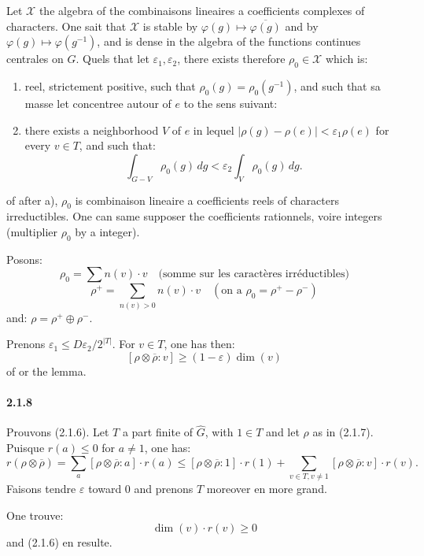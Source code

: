 \documentclass[12pt,a4paper]{article}
\theoremstyle{plain}
\theoremstyle{definition}
\theoremstyle{remark}
\begin{document}
Let $\mathcal{X}$ the algebra of the combinaisons lineaires a coefficients complexes of characters. One sait that $\mathcal{X}$ is stable by $\varphi(g) \mapsto \overline{\varphi(g)}$ and by $\varphi(g) \mapsto \varphi(g^{-1})$, and is dense in the algebra of the functions continues centrales on $G$. Quels that let $\varepsilon_1, \varepsilon_2$, there exists therefore $\rho_0 \in \mathcal{X}$ which is:
\begin{enumerate}[label=\alph*)]
\item reel, strictement positive, such that $\rho_0(g) = \rho_0(g^{-1})$, and such that sa masse let concentree autour of $e$ to the sens suivant:
\item there exists a neighborhood $V$ of $e$ in lequel $|\rho(g) - \rho(e)| < \varepsilon_1 \rho(e)$ for every $v \in T$, and such that:
\[ \int_{G-V} \rho_0(g)\, dg < \varepsilon_2 \int_V \rho_0(g)\, dg. \]
\end{enumerate}
of after a), $\rho_0$ is combinaison lineaire a coefficients reels of characters irreductibles. One can same supposer the coefficients rationnels, voire integers (multiplier $\rho_0$ by a integer).

Posons:
\[ \rho_0 = \sum n(v) \cdot v \quad \text{(somme sur les caract\`eres irr\'eductibles)} \]
\[ \rho^+ = \sum_{n(v) > 0} n(v) \cdot v \quad (\text{on a } \rho_0 = \rho^+ - \rho^-) \]
and: $\rho = \rho^+ \oplus \rho^-$.

Prenons $\varepsilon_1 \leq D \varepsilon_2 / 2^{|T|}$. For $v \in T$, one has then:
\[ [\rho \otimes \overline{\rho} : v] \geq (1 - \varepsilon) \dim(v) \]
of or the lemma.

\paragraph{2.1.8}
Prouvons (2.1.6). Let $T$ a part finite of $\widehat{G}$, with $1 \in T$ and let $\rho$ as in (2.1.7). Puisque $r(a) \leq 0$ for $a \neq 1$, one has:
\[ r(\rho \otimes \overline{\rho}) = \sum_a [\rho \otimes \overline{\rho} : a] \cdot r(a) \leq [\rho \otimes \overline{\rho} : 1] \cdot r(1) + \sum_{v \in T, v \neq 1} [\rho \otimes \overline{\rho} : v] \cdot r(v). \]
Faisons tendre $\varepsilon$ toward $0$ and prenons $T$ moreover en more grand.

One trouve:
\[ \dim(v) \cdot r(v) \geq 0 \]
and (2.1.6) en resulte.
\end{document}
